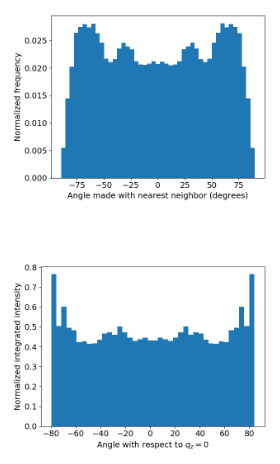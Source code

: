 \documentclass{article}
\begin{document}
  \begin{figure}[!htb]
  \centering
  	\begin{subfigure}{\linewidth}
	\centering
		\begin{subfigure}{0.45\textwidth}
        		\centering
        		\includegraphics[width=\linewidth]{offset_tail_packing.png}
        		\caption{}~\label{fig:offset_tails}
		\end{subfigure}
		\begin{subfigure}{0.45\textwidth}
		\centering
	        	\includegraphics[width=\linewidth]{offset_angle_v_I.png}
		        \caption{}~\label{fig:offset_integration}
		\end{subfigure}
	\end{subfigure}

\end{figure}
\end{document}
